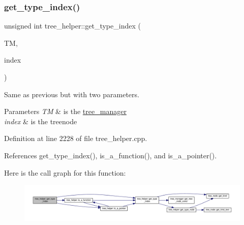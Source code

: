 \mbox{\label{classtree__helper_a6c8eec89f27115651412d6dbaa194bc8}} 
\subsubsection{\texorpdfstring{get\+\_\+type\+\_\+index()}{get\_type\_index()}\hspace{0.1cm}{\footnotesize\ttfamily [2/2]}}
{\footnotesize\ttfamily unsigned int tree\+\_\+helper\+::get\+\_\+type\+\_\+index (\begin{DoxyParamCaption}\item[{const \hyperlink{tree__manager_8hpp_a792e3f1f892d7d997a8d8a4a12e39346}{tree\+\_\+manager\+Const\+Ref}}]{TM,  }\item[{const unsigned int}]{index }\end{DoxyParamCaption})\hspace{0.3cm}{\ttfamily [static]}}



Same as previous but with two parameters. 


\begin{DoxyParams}{Parameters}
{\em TM} & is the \hyperlink{classtree__manager}{tree\+\_\+manager} \\
\hline
{\em index} & is the treenode \\
\hline
\end{DoxyParams}


Definition at line 2228 of file tree\+\_\+helper.\+cpp.



References get\+\_\+type\+\_\+index(), is\+\_\+a\+\_\+function(), and is\+\_\+a\+\_\+pointer().

Here is the call graph for this function\+:
\nopagebreak
\begin{figure}[H]
\begin{center}
\leavevmode
\includegraphics[width=350pt]{d7/d99/classtree__helper_a6c8eec89f27115651412d6dbaa194bc8_cgraph}
\end{center}
\end{figure}
\mbox{\label{classtree__helper_af20cbfb32e0a8e29ce353e57e358b823}} 
